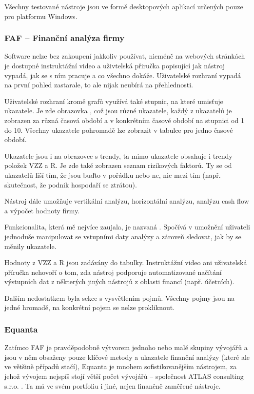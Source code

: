 Všechny testované nástroje jsou ve formě desktopových aplikací určených pouze pro platformu Windows.

\subsubsection{FAF -- Finanční analýza firmy}
Software nelze bez zakoupení jakkoliv používat, nicméně na webových stránkách je dostupné instruktážní video a uživtelská přiručka popisující jak nástroj vypadá, jak se s ním pracuje a co všechno dokáže. Uživatelské rozhraní vypadá na první pohled zastarale, to ale nijak neubírá na přehlednosti.

Uživatelské rozhraní kromě grafů využívá také stupnic, na které umisťuje ukazatele. Je zde obrazovka , což jsou různé ukazatele, každý z ukazatelů je zobrazen za různá časová období a v konkrétním časové období na stupnici od 1 do 10. Všechny ukazatele pohromadě lze zobrazit v tabulce pro jedno časové období.

Ukazatele jsou i na obrazovce s trendy, ta mimo ukazatele obsahuje i trendy položek VZZ a R. Je zde také zobrazen seznam rizikových faktorů. Ty se od ukazatelů liší tím, že jsou buďto v pořádku nebo ne, nic mezi tím (např. skutečnost, že podnik hospodaří se ztrátou).

Nástroj dále umožňuje vertikální analýzu, horizontální analýzu, analýzu cash flow a výpočet hodnoty firmy.

Funkcionalita, která mě nejvíce zaujala, je nazvaná . Spočívá v umožnění uživateli jednoduše manipulovat se vstupními daty analýzy a zároveň sledovat, jak by se měnily ukazatele.

Hodnoty z VZZ a R jsou zadávány do tabulky. Instruktážní video ani uživatelská příručka nehovoří o tom, zda nástroj podporuje automatizované načítání výstupních dat z některých jiných nástrojů z oblasti financí (např. účetních).

Dalším nedostatkem byla sekce s vysvětlením pojmů. Všechny pojmy jsou na jedné hromadě, na konkrétní pojem se nelze prokliknout.


\subsubsection{Equanta}
Zatímco FAF je pravděpodobně výtvorem jednoho nebo malé skupiny vývojářů a jsou v něm obsaženy pouze klíčové metody a ukazatele finanční analýzy (které ale ve většině případů stačí), Equanta je mnohem sofistikovanějším nástrojem, za jehož vývojem nejspíš stojí větší počet vývojářů -- společnost ATLAS consulting s.r.o. . Ta má ve svém portfoliu i jiné, nejen finančně zaměřené nástroje.

